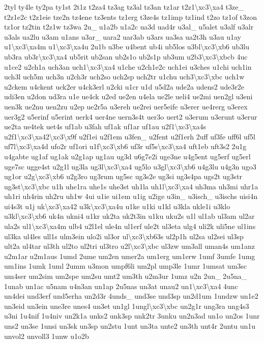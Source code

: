 {2tyl ty4le ty2pa ty1st 2t1z t2za4 tz3ag tz3al tz3an tz1ar t2z1\textbackslash{}xc3\textbackslash{}xa4 t3ze\-\_\- t2z1e2c t2z1eie tze2n tz4ene tz3ents tz1erg t3ze4s tz1imp tz1ind t2zo tz1of t3zon tz1or tz2tin t2z1w tz3wa 2u\-\_\- u1a2b u1a2c ua3d uad4r u3al\-\_\- u5alet u3alf u3alr u3als ua2lu u3am u1ans u3ar\-\_\- uara2 uar3ab u3ars ua3sa ua2t3h u3au u1ay u1\textbackslash{}xc3\textbackslash{}xa4m u1\textbackslash{}xc3\textbackslash{}xa4u 2u1b u3be u4bent ub4i ub5los u3bl\textbackslash{}xc3\textbackslash{}xb6 ub3lu ub3ra ub3r\textbackslash{}xc3\textbackslash{}xa4 ub5rit ub2san ub2s1o ub2s1p ub3um u2b3\textbackslash{}xc3\textbackslash{}xbcb 4uc u1ce2 u2ch1a uch3an uch1\textbackslash{}xc3\textbackslash{}xa4 u1che u2ch1e2c uch1ei u3ches u1chi uch1in uch3l uch5m uch3n u2ch3r uch2so uch2sp uch2tr u1chu uch3\textbackslash{}xc3\textbackslash{}xbc uch1w u2ckem u4ckent uck2er u4ck3erl u2cki u1cr u1d u5d2a ude2a udens2 ude3r2e udi3en u2don ud3ra u1e ue4ck u2ed ue2en u4ela ue2le ueli4 ue2mi uen2gl u3eni uen3k ue2nu uen2zu u2ep ue2r5a u3ereh ue2rei uer5eife u3erer ue4rerg u3erex uer3g2 u5erinf u5erint uerk4 uer4ne uern3s4t uer3o uert2 u3erum u3erunt u3erur ue2ta ue4tek uet4s uf1ab u3fah uf1ak uf1ar uf1au u2f1\textbackslash{}xc3\textbackslash{}xa4s u2f1\textbackslash{}xc3\textbackslash{}xa42\textbackslash{}xc3\textbackslash{}x9f u2f1ei u2f1em u3fen\-\_\- u2fent u2f1erh 2uff uf3fe uff6l uf5l uf7l\textbackslash{}xc3\textbackslash{}xa4d ufo2r uf1ori u1f\textbackslash{}xc3\textbackslash{}xb6 uf3r uf5s\textbackslash{}xc3\textbackslash{}xa4 uft1eb uft3s2 2u1g u4gabte ug1af ug1ak u2g1ap ug1au ug3d u6g7e2i uge3ne u4g5ent ug5erf ug5erl uge7sc ugge4st u2g1l ug3la ug3l\textbackslash{}xc3\textbackslash{}xa4 ug5lo u3gl\textbackslash{}xc3\textbackslash{}xb6 u4g3lu u4g3n ugo3 ug1or u2g\textbackslash{}xc3\textbackslash{}xb6 u2g3ro ug3rum ug5sc ug3s2e ug3si ug3s4pa ugs2t ug3str ug3st\textbackslash{}xc3\textbackslash{}xbc u1h uhe1ra uhe1s uhe3st uh1la uh1l\textbackslash{}xc3\textbackslash{}xa4 uh3ma uh3mi uhr1a uh1ri uh4rin uh2ru uh1w 4ui u1ie ui1em u1ig u2ige u3in\-\_\- u3isch\-\_\- u3ischs uisi4n ui4s3t u1j uk\textbackslash{}xc3\textbackslash{}xa42 u3k\textbackslash{}xc3\textbackslash{}xa4u u1ke u1ki u1kl u3kla ukle1i u3klo u3kl\textbackslash{}xc3\textbackslash{}xb6 uk4n ukni4 u1kr uk2ta uk2t3in u1ku uku2s u1l ul1ab ul3am ul2ar ula2s ul1\textbackslash{}xc3\textbackslash{}xa4m ulb4 u2l1el ule4n ul1erf ule2t ul3eta ulg4 uli2k uli5ne ul1ins ul3ka ul4les ull1s ulm3ein ulo2i ul3or ul\textbackslash{}xc3\textbackslash{}xb63s ul2p1h ul2sa ul2sei ul3sp ult2a ul4tar ul3th ul2to ul2tri ul3tro u2l\textbackslash{}xc3\textbackslash{}xbc ul3zw um3all uman4s um1anz u2m1ar u2m1aus 1umd 2ume um2en umer2a um1erg um1erw 1umf 3umfe 1umg um1ins 1umk 1uml 2umm u3mon umpf6li um2pl ump3le 1umr 1umsat um3sc um4ser um2sim um2spe um2su umt2 um3th u2m3ur 1umz u2n 2un\-\_\- 2u5na\-\_\- 1unab un1ac u5nam u4n3an un1ap 2u5nas un3at unau2 un1\textbackslash{}xc3\textbackslash{}xa4 4unc un4dei und3erf und5erha un2d3r 4unds\-\_\- und3se und3sp un2d1um 1undzw un1e2 un3eid un3ein une3re unes4 un3et un1gl 1ungl\textbackslash{}xc3\textbackslash{}xbc un2g1r ung3ra ung4s3 u3ni 1u4nif 1u4niv un2k1a unks2 unk3sp unk2tr 3unku un2n3ad un1o un2os 1unr uns2 un3se 1unsi un3sk un3sp un2stu 1unt un3ta unte2 un3th unt4r 2untu un1u unvol2 unvoll3 1unw u1o2b }
